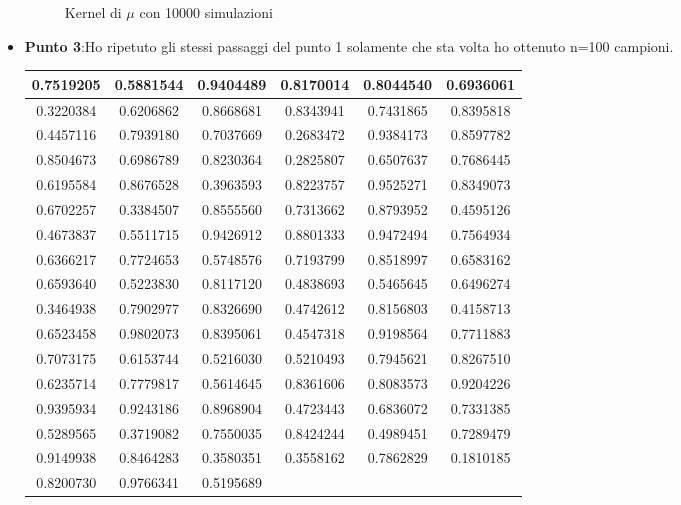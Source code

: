 \documentclass[a4paper,12pt]{article}
\begin{document}
\begin{itemize}
\begin{figure}[h]
		\caption{Kernel di $\mu$ con 10000 simulazioni} %
		\label{fig:immagine} %
	\end{figure}
	\newpage
	\item \textbf{Punto 3}:Ho ripetuto gli stessi passaggi del punto 1 solamente che sta volta ho ottenuto n=100 campioni.\\
	\begin{center}
		\begin{tabular}{|c|c|c|c|c|c|}
			\hline
			0.7519205 & 0.5881544 & 0.9404489 & 0.8170014 & 0.8044540 & 0.6936061 \\
			\hline
			0.3220384 & 0.6206862 & 0.8668681 & 0.8343941 & 0.7431865 & 0.8395818 \\
			\hline
			0.4457116 & 0.7939180 & 0.7037669 & 0.2683472 & 0.9384173 & 0.8597782 \\
			\hline
			0.8504673 & 0.6986789 & 0.8230364 & 0.2825807 & 0.6507637 & 0.7686445 \\
			\hline
			0.6195584 & 0.8676528 & 0.3963593 & 0.8223757 & 0.9525271 & 0.8349073 \\
			\hline
			0.6702257 & 0.3384507 & 0.8555560 & 0.7313662 & 0.8793952 & 0.4595126 \\
			\hline
			0.4673837 & 0.5511715 & 0.9426912 & 0.8801333 & 0.9472494 & 0.7564934 \\
			\hline
			0.6366217 & 0.7724653 & 0.5748576 & 0.7193799 & 0.8518997 & 0.6583162 \\
			\hline
			0.6593640 & 0.5223830 & 0.8117120 & 0.4838693 & 0.5465645 & 0.6496274 \\
			\hline
			0.3464938 & 0.7902977 & 0.8326690 & 0.4742612 & 0.8156803 & 0.4158713 \\
			\hline
			0.6523458 & 0.9802073 & 0.8395061 & 0.4547318 & 0.9198564 & 0.7711883 \\
			\hline
			0.7073175 & 0.6153744 & 0.5216030 & 0.5210493 & 0.7945621 & 0.8267510 \\
			\hline
			0.6235714 & 0.7779817 & 0.5614645 & 0.8361606 & 0.8083573 & 0.9204226 \\
			\hline
			0.9395934 & 0.9243186 & 0.8968904 & 0.4723443 & 0.6836072 & 0.7331385 \\
			\hline
			0.5289565 & 0.3719082 & 0.7550035 & 0.8424244 & 0.4989451 & 0.7289479 \\
			\hline
			0.9149938 & 0.8464283 & 0.3580351 & 0.3558162 & 0.7862829 & 0.1810185 \\
			\hline
			0.8200730 & 0.9766341 & 0.5195689 & & & \\

\end{tabular}
\end{center}
\end{itemize}
\end{document}
